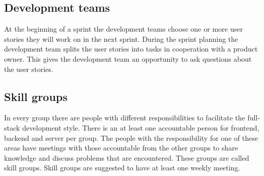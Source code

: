 \subsection{Development teams}
At the beginning of a sprint the development teams choose one or more user stories they will work on in the next sprint.
During the sprint planning the development team splits the user stories into tasks in cooperation with a product owner.
This gives the development team an opportunity to ask questions about the user stories.

\subsection{Skill groups}
In every group there are people with different responsibilities to facilitate the full-stack development style.
There is an at least one accountable person for frontend, backend and server per group.
The people with the responsibility for one of these areas have meetings with those accountable from the other groups to share knowledge and discuss problems that are encountered.
These groups are called skill groups.
Skill groups are suggested to have at least one weekly meeting.
